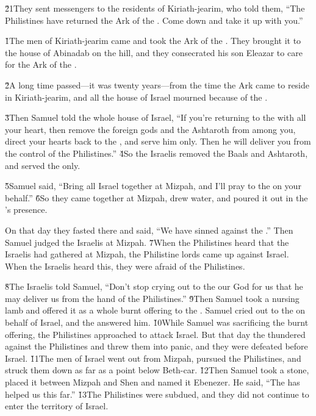 \v{21}They sent messengers to the residents of Kiriath-jearim, who told them, ``The Philistines have returned the Ark of the . Come down and take it up with you.''

\v{1}The men of Kiriath-jearim came and took the Ark of the . They brought it to the house of Abinadab on the hill, and they consecrated his son Eleazar to care for the Ark of the .

\v{2}A long time passed---it was twenty years---from the time the Ark came to reside in Kiriath-jearim, and all the house of Israel mourned because of the .

\v{3}Then Samuel told the whole house of Israel, ``If you're returning to the  with all your heart, then remove the foreign gods and the Ashtaroth from among you, direct your hearts back to the , and serve him only. Then he will deliver you from the control of the Philistines.'' \v{4}So the Israelis removed the Baals and Ashtaroth, and served the  only.

\v{5}Samuel said, ``Bring all Israel together at Mizpah, and I'll pray to the  on your behalf.'' \v{6}So they came together at Mizpah, drew water, and poured it out in the 's presence.

On that day they fasted there and said, ``We have sinned against the .'' Then Samuel judged the Israelis at Mizpah. \v{7}When the Philistines heard that the Israelis had gathered at Mizpah, the Philistine lords came up against Israel. When the Israelis heard this, they were afraid of the Philistines.

\v{8}The Israelis told Samuel, ``Don't stop crying out to the  our God for us that he may deliver us from the hand of the Philistines.'' \v{9}Then Samuel took a nursing lamb and offered it as a whole burnt offering to the . Samuel cried out to the  on behalf of Israel, and the  answered him. \v{10}While Samuel was sacrificing the burnt offering, the Philistines approached to attack Israel. But that day the  thundered against the Philistines and threw them into panic, and they were defeated before Israel. \v{11}The men of Israel went out from Mizpah, pursued the Philistines, and struck them down as far as a point below Beth-car. \v{12}Then Samuel took a stone, placed it between Mizpah and Shen and named it Ebenezer. He said, ``The  has helped us this far.'' \v{13}The Philistines were subdued, and they did not continue to enter the territory of Israel.

